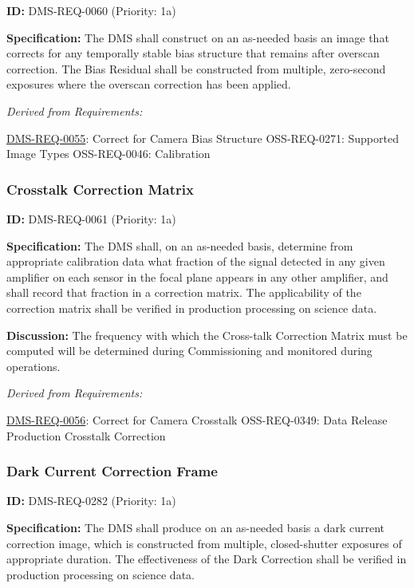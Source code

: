 \documentclass[SE,toc,lsstdraft]{lsstdoc}
\begin{document}
\label{DMS-REQ-0060}
\textbf{ID:} DMS-REQ-0060 (Priority: 1a)

\textbf{Specification:} The DMS shall construct on an as-needed basis an image that corrects for any temporally stable bias structure that remains after overscan correction. The Bias Residual shall be constructed from multiple, zero-second exposures where the overscan correction has been applied.

\emph{Derived from Requirements:}

\hyperref[DMS-REQ-0055]{DMS-REQ-0055}:
Correct for Camera Bias Structure \newline
OSS-REQ-0271:
Supported Image Types \newline
OSS-REQ-0046:
Calibration \newline

\subsubsection{Crosstalk Correction Matrix}

\label{DMS-REQ-0061}
\textbf{ID:} DMS-REQ-0061 (Priority: 1a)

\textbf{Specification:} The DMS shall, on an as-needed basis, determine from appropriate calibration data what fraction of the signal detected in any given amplifier on each sensor in the focal plane appears in any other amplifier, and shall record that fraction in a correction matrix. The applicability of the correction matrix shall be verified in production processing on science data.

\textbf{Discussion: }The frequency with which the Cross-talk Correction Matrix must be computed will be determined during Commissioning and monitored during operations.

\emph{Derived from Requirements:}

\hyperref[DMS-REQ-0056]{DMS-REQ-0056}:
Correct for Camera Crosstalk \newline
OSS-REQ-0349:
Data Release Production Crosstalk Correction \newline

\subsubsection{Dark Current Correction Frame}

\label{DMS-REQ-0282}
\textbf{ID:} DMS-REQ-0282 (Priority: 1a)

\textbf{Specification:} The DMS shall produce on an as-needed basis a dark current correction image, which is constructed from multiple, closed-shutter exposures of appropriate duration. The effectiveness of the Dark Correction shall be verified in production processing on science data.
\end{document}
